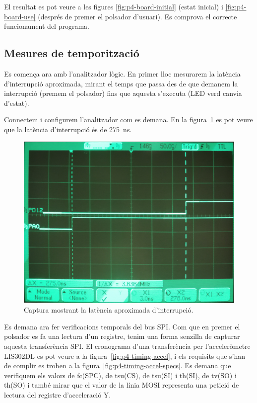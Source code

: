 El resultat es pot veure a les figures \ref{fig:p4-board-initial} (estat inicial) i
\ref{fig:p4-board-use} (després de premer el polsador d'usuari).
Es comprova el correcte funcionament del programa.


\subsection{Mesures de temporització}

Es comença ara amb l'analitzador lògic. En primer lloc mesurarem la latència d'interrupció
aproximada, mirant el temps que passa des de que demanem la interrupció (premem el polsador) fins que
aquesta s'executa (LED verd canvia d'estat).

Connectem i configurem l'analitzador com es demana.
En la figura~\ref{fig:p4-analyzer-latency} es pot veure que la latència d'interrupció és de
\SI{275}{\nano\second}.

\begin{figure}
  \includegraphics[width=.99\columnwidth]{../photos/analyzer/interrupt-latency}
  \caption{ \label{fig:p4-analyzer-latency} Captura mostrant la latència aproximada d'interrupció. }
\end{figure}

Es demana ara fer verificacions temporals del bus SPI. Com que en premer el polsador es fa
una lectura d'un registre, tenim una forma senzilla de capturar aquesta transferència SPI.
El cronograma d'una transferència per l'acceleròmetre LIS302DL es pot veure a la
figura~\ref{fig:p4-timing-accel}, i els requisits que s'han de complir es troben a la
figura~\ref{fig:p4-timing-accel-specs}. Es demana que verifiquem els valors de \textsf{fc(SPC)},
de \textsf{tsu(CS)}, de \textsf{tsu(SI)} i \textsf{th(SI)}, de \textsf{tv(SO)} i \textsf{th(SO)}
i també mirar que el valor de la línia \textsf{MOSI} representa una petició de lectura
del registre d'acceleració Y.

